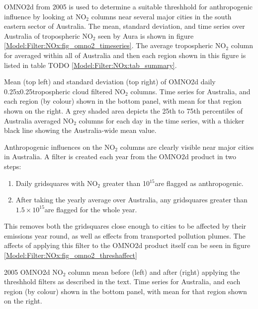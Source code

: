     OMNO2d from 2005 is used to determine a suitable threshhold for anthropogenic influence by looking at NO$_2$ columns near several major cities in the south eastern sector of Australia.
    The mean, standard deviation, and time series over Australia of tropospheric NO$_2$ seen by Aura is shown in figure \ref{Model:Filter:NOx:fig_omno2_timeseries}.
    The average tropospheric NO$_2$ column for averaged within all of Australia and then each region shown in this figure is listed in table TODO \ref{Model:Filter:NOx:tab_summary}.
    
    {Mean (top left) and standard deviation (top right) of OMNO2d daily 0.25x0.25\degr tropospheric cloud filtered NO$_2$ columns. Time series for Australia, and each region (by colour) shown in the bottom panel, with mean for that region shown on the right. A grey shaded area depicts the 25th to 75th percentiles of Australia averaged NO$_2$ columns for each day in the time series, with a thicker black line showing the Australia-wide mean value.}
    {\label{Model:Filter:NOx:fig_omno2_timeseries}}
    
    Anthropogenic influences on the NO$_2$ columns are clearly visible near major cities in Australia.
    A filter is created each year from the OMNO2d product in two steps:
    \begin{enumerate}
      \item Daily gridsquares with NO$_2$ greater than 10$^{15}$\moleccm  are flagged as anthropogenic.
      \item After taking the yearly average over Australia, any gridsquares greater than $1.5 \times 10^{15}$\moleccm are flagged for the whole year.
    \end{enumerate}
    This removes both the gridsquares close enough to cities to be affected by their emissions year round, as well as effects from transported pollution plumes.
    The affects of applying this filter to the OMNO2d product itself can be seen in figure \ref{Model:Filter:NOx:fig_omno2_threshaffect}
    
    {2005 OMNO2d NO$_2$ column mean before (left) and after (right) applying the threshhold filters as described in the text. Time series for Australia, and each region (by colour) shown in the bottom panel, with mean for that region shown on the right.}
    {\label{Model:Filter:NOx:fig_omno2_threshaffect}}
    
